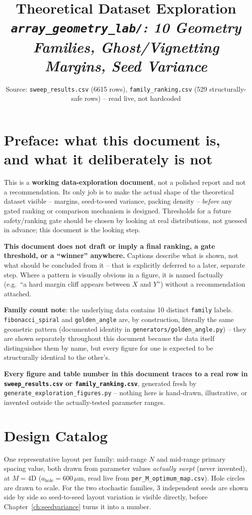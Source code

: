 \documentclass[11pt]{report}
\title{\textbf{\Huge Theoretical Dataset Exploration}\\[0.3cm]
\large\itshape \texttt{array\_geometry\_lab/}: 10 Geometry Families, Ghost/Vignetting Margins,
Seed Variance}
\author{}
\date{Source: \texttt{sweep\_results.csv} (6615 rows), \texttt{family\_ranking.csv} (529
structurally-safe rows) -- read live, not hardcoded}
\begin{document}
\maketitle
\tableofcontents

\chapter*{Preface: what this document is, and what it deliberately is not}
This is a \textbf{working data-exploration document}, not a polished report and not a
recommendation. Its only job is to make the actual shape of the theoretical dataset
visible -- margins, seed-to-seed variance, packing density -- \emph{before} any gated
ranking or comparison mechanism is designed. Thresholds for a future safety/ranking gate
should be chosen by looking at real distributions, not guessed in advance; this document
is the looking step.

\textbf{This document does not draft or imply a final ranking, a gate threshold, or a
``winner'' anywhere.} Captions describe what is shown, not what should be concluded from
it -- that is explicitly deferred to a later, separate step. Where a pattern is visually
obvious in a figure, it is named factually (e.g.\ ``a hard margin cliff appears between
$X$ and $Y$'') without a recommendation attached.

\textbf{Family count note}: the underlying data contains 10 distinct \texttt{family}
labels. \texttt{fibonacci\_spiral} and \texttt{golden\_angle} are, by construction,
literally the same geometric pattern (documented identity in
\texttt{generators/golden\_angle.py}) -- they are shown separately throughout this
document because the data itself distinguishes them by name, but every figure for one is
expected to be structurally identical to the other's.

\textbf{Every figure and table number in this document traces to a real row in
\texttt{sweep\_results.csv} or \texttt{family\_ranking.csv}}, generated fresh by
\texttt{generate\_exploration\_figures.py} -- nothing here is hand-drawn, illustrative, or
invented outside the actually-tested parameter ranges.

\chapter{Design Catalog}
One representative layout per family: mid-range $N$ and mid-range primary spacing value,
both drawn from parameter values \emph{actually swept} (never invented), at $M=4$D
($a_{\text{hole}}=600\,\mu$m, read live from \texttt{per\_M\_optimum\_map.csv}). Hole
circles are drawn to scale. For the two stochastic families, 3 independent seeds are
shown side by side so seed-to-seed layout variation is visible directly, before
Chapter~\ref{ch:seedvariance} turns it into a number.
\end{document}
